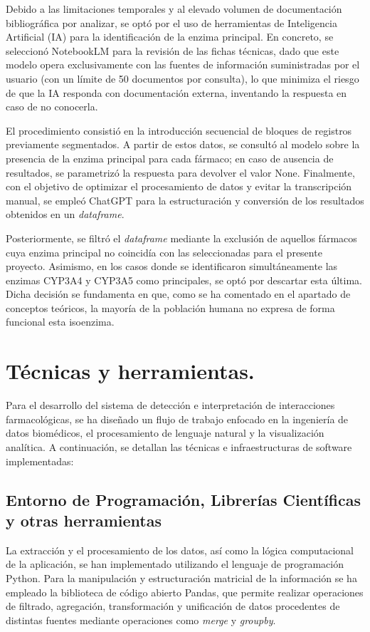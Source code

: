 Debido a las limitaciones temporales y al elevado volumen de documentación bibliográfica por analizar, se optó por el uso de herramientas de Inteligencia Artificial (IA) para la identificación de la enzima principal. En concreto, se seleccionó NotebookLM para la revisión de las fichas técnicas, dado que este modelo opera exclusivamente con las fuentes de información suministradas por el usuario (con un límite de 50 documentos por consulta), lo que minimiza el riesgo de que la IA responda con documentación externa, inventando la respuesta en caso de no conocerla.

El procedimiento consistió en la introducción secuencial de bloques de registros previamente segmentados. A partir de estos datos, se consultó al modelo sobre la presencia de la enzima principal para cada fármaco; en caso de ausencia de resultados, se parametrizó la respuesta para devolver el valor None. Finalmente, con el objetivo de optimizar el procesamiento de datos y evitar la transcripción manual, se empleó ChatGPT para la estructuración y conversión de los resultados obtenidos en un \textit{dataframe}.

Posteriormente, se filtró el \textit{dataframe} mediante la exclusión de aquellos fármacos cuya enzima principal no coincidía con las seleccionadas para el presente proyecto. Asimismo, en los casos donde se identificaron simultáneamente las enzimas CYP3A4 y CYP3A5 como principales, se optó por descartar esta última. Dicha decisión se fundamenta en que, como se ha comentado en el apartado de conceptos teóricos, la mayoría de la población humana no expresa de forma funcional esta isoenzima.

\section{Técnicas y herramientas.}
Para el desarrollo del sistema de detección e interpretación de interacciones farmacológicas, se ha diseñado un flujo de trabajo enfocado en la ingeniería de datos biomédicos, el procesamiento de lenguaje natural y la visualización analítica. A continuación, se detallan las técnicas e infraestructuras de software implementadas:

\subsection{Entorno de Programación, Librerías Científicas y otras herramientas}
La extracción y el procesamiento de los datos, así como la lógica computacional de la aplicación, se han implementado utilizando el lenguaje de programación Python. Para la manipulación y estructuración matricial de la información se ha empleado la biblioteca de código abierto Pandas, que permite realizar operaciones de filtrado, agregación, transformación y unificación de datos procedentes de distintas fuentes mediante operaciones como \textit{merge} y \textit{groupby}.

